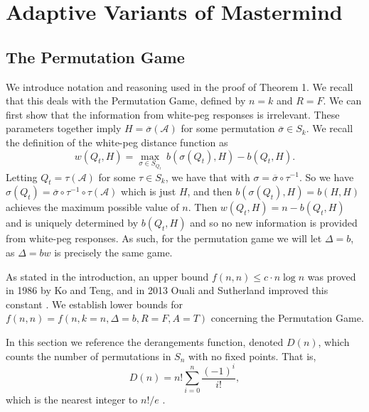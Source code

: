\documentclass[12pt, a4paper]{article}
\newcommand{\inv}{^{-1}}              %
\begin{document}
\section{Adaptive Variants of Mastermind}
\subsection{The Permutation Game}
We introduce notation and reasoning used in the proof of Theorem 1. We recall that this deals with the Permutation Game, defined by $n=k$ and $R=F$. We can first show that the information from white-peg responses is irrelevant. These parameters together imply $H=\overline{\sigma}(\mathcal{A})$ for some permutation $\overline{\sigma}\in S_k$. We recall the definition of the white-peg distance function as
\begin{equation*}
	w(Q_t, H) = \max_{\sigma\in S_{Q_t}}~b(\sigma(Q_t), H) - b(Q_t, H).
\end{equation*}
Letting $Q_t = \tau(\mathcal{A})$ for some $\tau \in S_k$, we have that with $\sigma = \overline{\sigma}\circ \tau\inv$. So we have $\sigma(Q_t) = \overline{\sigma}\circ\tau\inv\circ\tau(\mathcal A)$ which is just $H$, and then $b(\sigma(Q_t),H) = b(H,H)$ achieves the maximum possible value of $n$. Then $w(Q_t,H) = n - b(Q_t,H)$ and is uniquely determined by $b(Q_t,H)$ and so no new information is provided from white-peg responses. As such, for the permutation game we will let $\Delta = b$, as $\Delta = bw$ is precisely the same game.

 As stated in the introduction, an upper bound $f(n, n)\le c\cdot n\log n$ was proved in 1986 by Ko and Teng, and in 2013 Ouali and Sutherland improved this constant \cite{KT86, OS13}. We establish lower bounds for $f(n, n) = f(n, k=n, \Delta=b, R=F, A=T)$ concerning the Permutation Game.
 
 In this section we reference the derangements function, denoted $D(n)$, which counts the number of permutations in $S_n$ with no fixed points. That is,
\begin{equation}\label{derangements}
	D(n) = n!\sum_{i=0}^n \frac{(-1)^i}{i!},
\end{equation}
which is the nearest integer to $n!/e$  \cite{MH03}.
\end{document}
